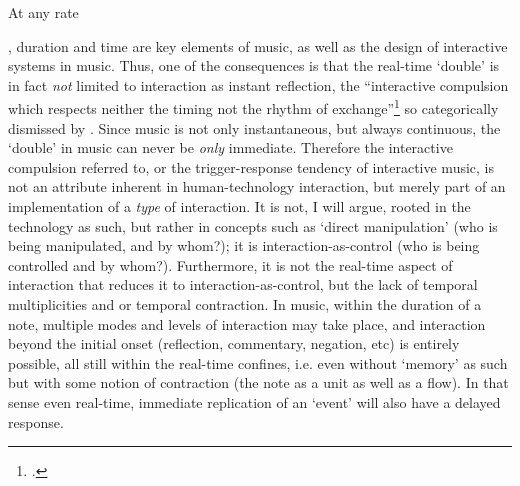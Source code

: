 \hypertarget{par:human-comp-inter:10}{At any rate}, duration and time are key elements of music, as well as the design of interactive systems in music. Thus, one of the consequences is that the real-time `double' is in fact \emph{not} limited to interaction as instant reflection, the ``interactive compulsion which respects neither the timing not the rhythm of exchange''\footcite[31]{baudrillard96:writing} so categorically dismissed by \citeauthor{baudrillard96}. Since music is not only instantaneous, but always continuous, the `double' in music can never be \emph{only} immediate. Therefore the interactive compulsion referred to, or the trigger-response tendency of interactive music, is not an attribute inherent in human-technology interaction, but merely part of an implementation of a \emph{type} of interaction. It is not, I will argue, rooted in the technology as such, but rather in concepts such as `direct manipulation' (who is being manipulated, and by whom?); it is interaction-as-control (who is being controlled and by whom?). Furthermore, it is not the real-time aspect of interaction that reduces it to interaction-as-control, but the lack of temporal multiplicities and or temporal contraction. In music, within the duration of a note, multiple modes and levels of interaction may take place, and interaction beyond the initial onset (reflection, commentary, negation, etc) is entirely possible, all still within the real-time confines, i.e. even without `memory' as such but with some notion of contraction (the note as a unit as well as a flow). In that sense even real-time, immediate replication of an `event' will also have a delayed response.

